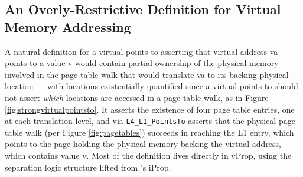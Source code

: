 \subsection{An Overly-Restrictive Definition for Virtual Memory Addressing}
\label{sec:overly-restrictive}
A natural definition for a virtual points-to
asserting that virtual address \textsf{va} points to a value \textsf{v}
would 
contain
partial ownership of the physical memory involved in the page table walk that would translate \textsf{va} to
its backing physical location --- with locations existentially quantified since a virtual points-to should not assert
\emph{which} locations are accessed in a page table walk, as in Figure \ref{fig:strongvirtualpointsto}.
It asserts the existence of four page table entries, one at each translation level, and via \lstinline|L4_L1_PointsTo|
asserts that the physical page table walk (per Figure \ref{fig:pagetables}) succeeds in reaching the L1 entry,
which points to the page holding the physical memory backing the virtual address, which contains value \textsf{v}.
Most of the definition lives directly in \textsf{vProp}, using the separation logic structure lifted from \iris's \textsf{iProp}.

